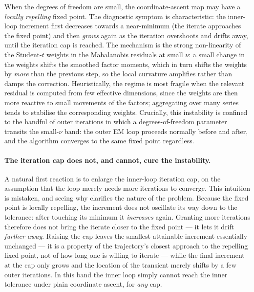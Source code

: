 \documentclass[11pt, a4paper, oneside]{article}
\begin{document}
When the degrees of freedom are small, the coordinate-ascent map may
have a \emph{locally repelling} fixed point. The diagnostic symptom is
characteristic: the inner-loop increment first decreases towards a
near-minimum (the iterate approaches the fixed point) and then
\emph{grows} again as the iteration overshoots and drifts away, until
the iteration cap is reached. The mechanism is the strong
non-linearity of the Student-$t$ weights in the Mahalanobis residuals
at small $\nu$: a small change in the weights shifts the smoothed
factor moments, which in turn shifts the weights by \emph{more} than
the previous step, so the local curvature amplifies rather than damps
the correction. Heuristically, the regime is most fragile when the
relevant residual is computed from few effective dimensions, since the
weights are then more reactive to small movements of the factors;
aggregating over many series tends to stabilise the corresponding
weights. Crucially, this instability is confined to the handful of
outer iterations in which a degrees-of-freedom parameter transits the
small-$\nu$ band: the outer EM loop proceeds normally before and
after, and the algorithm converges to the same fixed point
regardless.

\paragraph{The iteration cap does not, and cannot, cure the
instability.}
A natural first reaction is to enlarge the inner-loop iteration cap,
on the assumption that the loop merely needs more iterations to
converge. This intuition is mistaken, and seeing why clarifies the
nature of the problem. Because the fixed point is locally repelling,
the increment does not oscillate its way down to the tolerance: after
touching its minimum it \emph{increases} again. Granting more
iterations therefore does not bring the iterate closer to the fixed
point --- it lets it drift \emph{further away}. Raising the cap leaves
the smallest attainable increment essentially unchanged --- it is a
property of the trajectory's closest approach to the repelling fixed
point, not of how long one is willing to iterate --- while the final
increment at the cap only grows and the location of the transient
merely shifts by a few outer iterations. In this band the inner loop
simply cannot reach the inner tolerance under plain coordinate ascent,
for \emph{any} cap.
\end{document}
